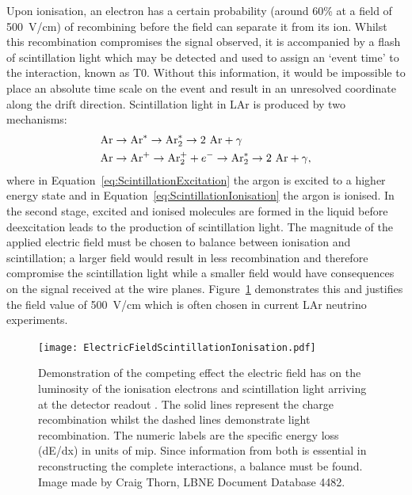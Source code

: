 Upon ionisation, an electron has a certain probability (around 60\% at a field of 500~V/cm) of recombining before the field can separate it from its ion.  Whilst this recombination compromises the signal observed, it is accompanied by a flash of scintillation light which may be detected and used to assign an `event time' to the interaction, known as T0.  Without this information, it would be impossible to place an absolute time scale on the event and result in an unresolved coordinate along the drift direction.  Scintillation light in LAr is produced by two mechanisms:
\begin{align}
  \label{eq:ScintillationExcitation} \textnormal{Ar} &\rightarrow \textnormal{Ar}^* \rightarrow \textnormal{Ar}_2^* \rightarrow 2~\textnormal{Ar} + \gamma \\
  \label{eq:ScintillationIonisation} \textnormal{Ar} &\rightarrow \textnormal{Ar}^+ \rightarrow \textnormal{Ar}_2^+ + e^- \rightarrow \textnormal{Ar}_2^* \rightarrow 2~\textnormal{Ar} + \gamma ,
\end{align}
where in Equation~\ref{eq:ScintillationExcitation} the argon is excited to a higher energy state and in Equation~\ref{eq:ScintillationIonisation} the argon is ionised.  In the second stage, excited and ionised molecules are formed in the liquid before deexcitation leads to the production of scintillation light.  The magnitude of the applied electric field must be chosen to balance between ionisation and scintillation; a larger field would result in less recombination and therefore compromise the scintillation light while a smaller field would have consequences on the signal received at the wire planes.  Figure~\ref{fig:ElectricFieldScintillationIonisation} demonstrates this and justifies the field value of 500~V/cm which is often chosen in current LAr neutrino experiments.

\begin{figure}
  \centering
  \texttt{[image: ElectricFieldScintillationIonisation.pdf]}
  \caption[Effect of electric field on luminosity of ionisation electrons and scintillation light in a LArTPC.]{Demonstration of the competing effect the electric field has on the luminosity of the ionisation electrons and scintillation light arriving at the detector readout \cite{Thomas1987,Amoruso2004,Kubota1978}.  The solid lines represent the charge recombination whilst the dashed lines demonstrate light recombination.  The numeric labels are the specific energy loss (dE/dx) in units of mip.  Since information from both is essential in reconstructing the complete interactions, a balance must be found.  Image made by Craig Thorn, LBNE Document Database 4482.}
  \label{fig:ElectricFieldScintillationIonisation}
\end{figure}

